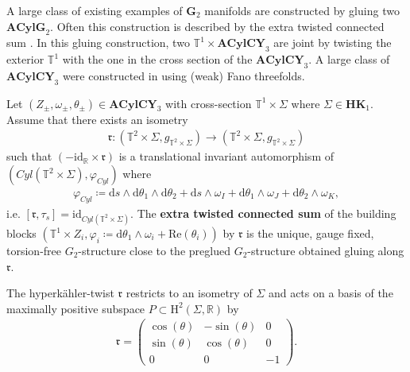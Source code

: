 \documentclass[psamsfonts]{amsart}
\theoremstyle{plain}
\theoremstyle{definition}{
\newtheorem{defi}{Definition}[section]
\newtheorem{ass}{Assumption}
\newtheorem*{nota}{Notation}}
\theoremstyle{remark}{
\newtheorem{rem}{Remark}
\newtheorem{ex}{Example}}
\theoremstyle{plain}{
\newtheorem{thm}{Theorem}[section]
\newtheorem{lem}{Lemma}[section]
\newtheorem{cor}{Corollary}[section]
\newtheorem{prop}{Proposition}[section]
\newtheorem{con}{Conjecture}[section]}
\newcommand{\m}[1]{{\mathrm{#1}}}
\newcommand{\cat}[1]{\textbf{#1}}
\begin{document}
A large class of existing examples of $\cat{G}_2$ manifolds are constructed by gluing two $\cat{ACylG}_2$. Often this construction is described by the extra twisted connected sum \cite{nordstrom2023extra}. In this gluing construction, two $\mathbb{T}^1\times \cat{ACylCY}_3$ are joint by twisting the exterior $\mathbb{T}^1$ with the one in the cross section of the $\cat{ACylCY}_3$. A large class of $\cat{ACylCY}_3$ were constructed in \cite{CHNP,Corti_2015} using (weak) Fano threefolds.


   \begin{defi}
        Let $(Z_\pm,\omega_\pm,\theta_\pm)\in\cat{ACyl}\cat{CY}_3$ with cross-section $\mathbb{T}^1\times \Sigma$ where $\Sigma\in\cat{HK}_1$. Assume that there exists an isometry
        \begin{align*}
            \mathfrak{r}\colon (\mathbb{T}^2\times \Sigma,g_{\mathbb{T}^2\times \Sigma})\rightarrow (\mathbb{T}^2\times \Sigma,g_{\mathbb{T}^2\times \Sigma})
        \end{align*}
        such that $(-\m{id}_{\mathbb{R}}\times \mathfrak{r})$ is a translational invariant automorphism of
        $(Cyl(\mathbb{T}^2\times \Sigma),\varphi_{Cyl})$
        where
        \begin{align*}
            \varphi_{Cyl}\coloneqq\m{d}s\wedge\m{d}\theta_1\wedge\m{d}\theta_2+  \m{d}s\wedge\omega_I+\m{d}\theta_1\wedge \omega_J+\m{d}\theta_2\wedge \omega_K,
        \end{align*}
        i.e. $[\mathfrak{r},\tau_s]=\m{id}_{Cyl(\mathbb{T}^2\times \Sigma)}$. The \textbf{extra twisted connected sum} of the building blocks  $(\mathbb{T}^1\times Z_i,\varphi_i\coloneqq\m{d}\theta_1\wedge\omega_i+\m{Re}(\theta_i))$ by $\mathfrak{r}$ is the unique, gauge fixed, torsion-free $G_2$-structure close to the preglued $G_2$-structure obtained gluing along $\mathfrak{r}$. 
    \end{defi}

The hyperkähler-twist $\mathfrak{r}$ restricts to an isometry of $\Sigma$ and acts on a basis of the maximally positive subspace $P\subset \m{H}^2(\Sigma,\mathbb{R})$ by
\begin{align*}
    \mathfrak{r}=\left(\begin{array}{ccc}
         \cos(\theta)&-\sin(\theta) &0 \\
         \sin(\theta)&\cos(\theta) &0\\
         0&0&-1
    \end{array}\right).
\end{align*}
    
\end{document}
